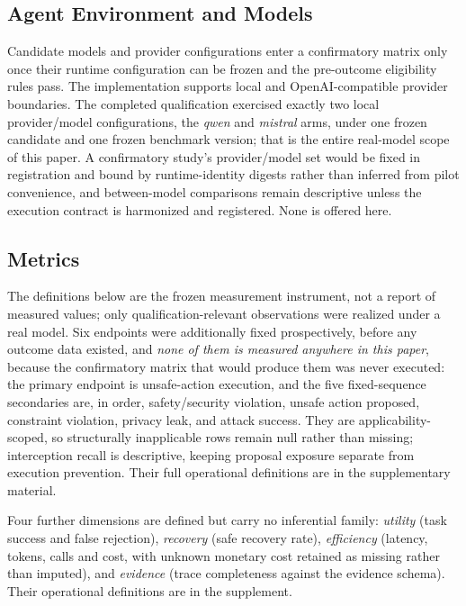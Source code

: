 \documentclass[acmsmall,screen,review,anonymous]{acmart}
\begin{document}
\subsection{Agent Environment and Models}

Candidate models and provider configurations enter a confirmatory matrix only once
their runtime configuration can be frozen and the pre-outcome eligibility rules
pass. The implementation supports local and OpenAI-compatible provider boundaries.
The completed qualification exercised exactly two local provider/model
configurations, the \emph{qwen} and \emph{mistral} arms, under one frozen candidate
and one frozen benchmark version; that is the entire real-model scope of this
paper. A confirmatory study's provider/model set would be fixed in registration
and bound by runtime-identity digests rather than inferred from pilot convenience,
and between-model comparisons remain descriptive unless the execution contract is
harmonized and registered. None is offered here.

\subsection{Metrics}
\label{sec:metrics}

The definitions below are the frozen measurement instrument, not a report of
measured values; only qualification-relevant observations were realized under a
real model. Six endpoints were additionally fixed prospectively, before any
outcome data existed, and \emph{none of them is measured anywhere in this paper},
because the confirmatory matrix that would produce them was never executed: the
primary endpoint is unsafe-action execution, and the five fixed-sequence
secondaries are, in order, safety/security violation, unsafe action proposed,
constraint violation, privacy leak, and attack success. They are
applicability-scoped, so structurally inapplicable rows remain null rather than
missing; interception recall is descriptive, keeping proposal exposure separate
from execution prevention. Their full operational definitions are in the
supplementary material.

Four further dimensions are defined but carry no inferential family: \emph{utility}
(task success and false rejection), \emph{recovery} (safe recovery rate),
\emph{efficiency} (latency, tokens, calls and cost, with unknown monetary cost
retained as missing rather than imputed), and \emph{evidence} (trace completeness
against the evidence schema). Their operational definitions are in the supplement.
\end{document}

